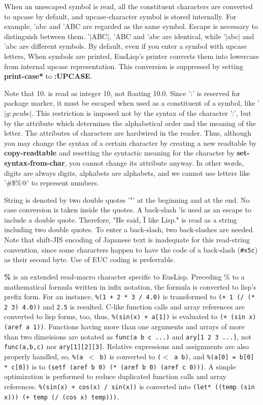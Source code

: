 When an unescaped symbol is read,
all the constituent characters are converted to upcase by default,
and upcase-character symbol is stored internally.
For example, 'abc and 'ABC are regarded as the same symbol.
Escape is necessary to distinguish between them.
'$|$ABC$|$, 'ABC and 'abc are identical,
while '$|$abc$|$ and 'abc are different symbols.
By default, even if you enter a symbol with upcase letters,
When symbols are printed,
EusLisp's printer converts them into lowercase from
internal upcase representation.
This conversion is
suppressed by setting {\bf *print-case*} to {\bf :UPCASE}.

Note that 10. is read as integer 10, not floating 10.0.
Since ':' is reserved for package marker, it must be escaped
when used as a constituent of a symbol, like '$|g:pcube|$.
This restriction is imposed not by the syntax of the character ':',
but by the attribute which determines the alphabetical order and the meaning of
the letter.
The attributes of characters are hardwired in the reader.
Thus, although you may change the syntax of a certain character by
creating a new readtable by {\bf copy-readtable} and
resetting the syntactic meaning for the character by {\bf set-syntax-from-char},
you cannot change its attribute anyway. 
In other words, digits are always digits, alphabets are alphabets,
and we cannot use letters like '\#\$\%@' to represent numbers.

String is denoted by two double quotes '"' at the beginning and at the end.
No case conversion is taken inside the quotes.
A back-slash '\' is used as an escape to include a double quote.
Therefore, "He said, \"I like Lisp.\"" is read as a string
including two double quotes.
To enter a back-slash, two back-slashes are needed.
Note that shift-JIS encoding of Japanese text is inadequate for this
read-string convention, since some characters happen to have the
code of a back-slash (\verb+#x5c+) as their second byte.
Use of EUC coding is preferrable.


{\bf \%} is an extended read-macro character specific to EusLisp.
Preceding \% to a mathematical formula written in infix notation,
the formula is converted to lisp's prefix form. For an instance,
{\tt \%(1 + 2 * 3 / 4.0)} is transformed to
{\tt (+ 1 (/ (* 2 3) 4.0))} and {\tt 2.5} is resulted.
C-like function calls and array references are converted to lisp forms, too,
thus, {\tt \%(sin(x) + a[1])}
is evaluated to {\tt  (+ (sin x) (aref a 1))}.
Functions having more than one arguments and arrays of more than two
dimeisions are notated as {\tt func(a b c ...)} and {\tt ary[1 2 3 ...]},
not {\tt func(a,b,c)} nor {\tt ary[1][2][3]}.
Relative expressions and assignments are also properly handled, so,
{\tt \%(a $<$ b)} is converted to {\tt ($<$ a b)},
and {\tt \%(a[0] = b[0] * c[0])} is to
{\tt (setf (aref b 0) (* (aref b 0) (aref c 0)))}.
A simple optimization is performed to reduce duplicated function calls and
array references.
{\tt \%(sin(x) + cos(x) / sin(x))} is converted into 
{\tt (let* ((temp (sin x))) (+ temp (/ (cos x) temp)))}.

